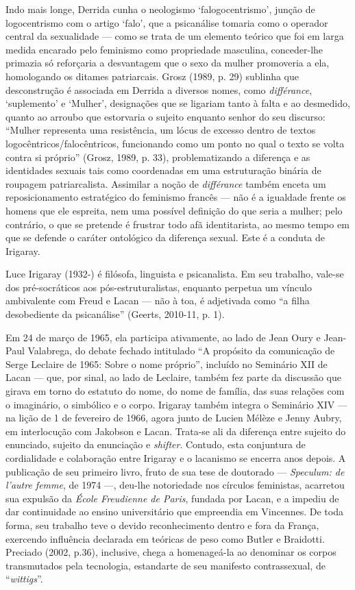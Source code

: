 Indo mais longe, Derrida cunha o neologismo `falogocentrismo', junção de
logocentrismo com o artigo `falo', que a psicanálise tomaria como o
operador central da sexualidade --- como se trata de um elemento teórico
que foi em larga medida encarado pelo feminismo como propriedade
masculina, conceder-lhe primazia só reforçaria a desvantagem que o sexo
da mulher promoveria a ela, homologando os ditames patriarcais. Grosz
(1989, p. 29) sublinha que desconstrução é associada em Derrida a
diversos nomes, como \emph{différance}, `suplemento' e `Mulher',
designações que se ligariam tanto à falta e ao desmedido, quanto ao
arroubo que estorvaria o sujeito enquanto senhor do seu discurso:
``Mulher representa uma resistência, um lócus de excesso dentro de
textos logocêntricos/falocêntricos, funcionando como um ponto no qual o
texto se volta contra si próprio'' (Grosz, 1989, p. 33), problematizando
a diferença e as identidades sexuais tais como coordenadas em uma
estruturação binária de roupagem patriarcalista. Assimilar a noção de
\emph{différance} também enceta um reposicionamento estratégico do
feminismo francês --- não é a igualdade frente os homens que ele
espreita, nem uma possível definição do que seria a mulher; pelo
contrário, o que se pretende é frustrar todo afã identitarista, ao mesmo
tempo em que se defende o caráter ontológico da diferença sexual. Este é
a conduta de Irigaray.

Luce Irigaray (1932-) é filósofa, linguista e psicanalista. Em seu
trabalho, vale-se dos pré-socráticos aos pós-estruturalistas, enquanto
perpetua um vínculo ambivalente com Freud e Lacan --- não à toa, é
adjetivada como ``a filha desobediente da psicanálise'' (Geerts,
2010-11, p. 1).

Em 24 de março de 1965, ela participa ativamente, ao lado de Jean Oury e
Jean-Paul Valabrega, do debate fechado intitulado ``A propósito da
comunicação de Serge Leclaire de 1965: Sobre o nome próprio'', incluído
no Seminário XII de Lacan --- que, por sinal, ao lado de Leclaire, também
fez parte da discussão que girava em torno do estatuto do nome, do nome
de família, das suas relações com o imaginário, o simbólico e o corpo.
Irigaray também integra o Seminário XIV --- na lição de 1 de fevereiro de
1966, agora junto de Lucien Mélèze e Jenny Aubry, em interlocução com
Jakobson e Lacan. Trata-se ali da diferença entre sujeito do enunciado,
sujeito da enunciação e \emph{shifter}. Contudo, esta conjuntura de
cordialidade e colaboração entre Irigaray e o lacanismo se encerra anos
depois. A publicação de seu primeiro livro, fruto de sua tese de
doutorado --- \emph{Speculum: de l'autre femme}, de 1974 ---, deu-lhe
notoriedade nos círculos feministas, acarretou sua expulsão da
\emph{École Freudienne de Paris}, fundada por Lacan, e a impediu de dar
continuidade ao ensino universitário que empreendia em Vincennes. De
toda forma, seu trabalho teve o devido reconhecimento dentro e fora da
França, exercendo influência declarada em teóricas de peso como Butler e
Braidotti. Preciado (2002, p.36), inclusive, chega a homenageá-la ao
denominar os corpos transmutados pela tecnologia, estandarte de seu
manifesto contrassexual, de ``\emph{wittigs}''.

